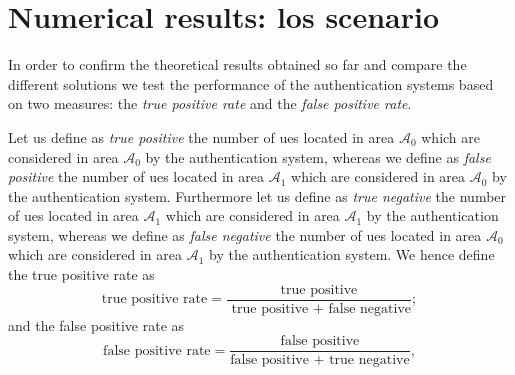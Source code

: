 \documentclass[draftcls,onecolumn,12pt]{IEEEtran}
\begin{document}

\section{Numerical results: los scenario}\label{sec:res_los}
In order to confirm the theoretical results obtained so far and compare the different solutions we test the performance of the authentication systems based on two measures: the \textit{true positive rate} and the \textit{false positive rate}. 

Let us define as \textit{true positive} the number of \acp{ue} located in area $\mathcal{A}_0$ which are considered in area $\mathcal{A}_0$ by the authentication system, whereas we define as \textit{false positive} the number of \acp{ue} located in area $\mathcal{A}_1$ which are considered in area $\mathcal{A}_0$ by the authentication system. Furthermore let us define as \textit{true negative} the number of \acp{ue} located in area $\mathcal{A}_1$ which are considered in area $\mathcal{A}_1$ by the authentication system, whereas we define as \textit{false negative} the number of \acp{ue} located in area $\mathcal{A}_0$ which are considered in area $\mathcal{A}_1$ by the authentication system.
We hence define the true positive rate as
\begin{equation}
    \text{true positive rate} = \frac{\text{true positive}}{\text{ true positive + false negative}};
\end{equation}
and the false positive rate as
\begin{equation}
    \text{false positive rate} = \frac{\text{false positive}}{\text{false positive + true negative}},
\end{equation}
\end{document}
